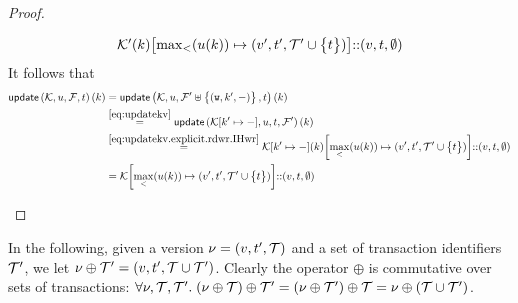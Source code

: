 \begin{proof}
\begin{enumerate}
\begin{itemize}
\begin{equation}
\begin{array}{l}
            \mkvs'(\key)\rmto{\max_{<}(\vi(\key))}{(\val', \txid', \txidset' \cup \Set{\txid})} \lcat (\val, \txid, \emptyset)
            \end{array}
			\end{equation}
			It follows that 
            \begin{align*}
			    \updateKV[\mkvs, \vi, \fp, \txid](\key)
                & =
                \updateKV[\mkvs, \vi, \fp' \uplus \Set{(\otW, \key', \stub)}, \txid](\key) \\
                & \stackrel{\cref{eq:updatekv}}{=} 
			    \updateKV[\mkvs\rmto{\key'}{\stub}, \vi, \txid, \fp'](\key) \\
                & \stackrel{\cref{eq:updatekv.explicit.rdwr.IHwr}}{=}
                \mkvs\rmto{\key'}{\stub}(\key)\rmto{\max_{<}(\vi(\key))}{(\val', \txid', \txidset' \cup \Set{\txid})} \lcat (\val, \txid, \emptyset) \\
                & =
                \mkvs\rmto{\max_{<}(\vi(\key))}{(\val', \txid', \txidset' \cup \Set{\txid})} \lcat (\val, \txid, \emptyset)
            \end{align*}
			\end{itemize}
\end{enumerate}
\end{proof}

In the following, given a version $\nu = (v, t', \mathcal{T})$ and a set of 
transaction identifiers $\mathcal{T}'$, we let $\nu \oplus \mathcal{T}' = (v, t', \mathcal{T} \cup \mathcal{T}')$. 
Clearly the operator $\oplus$ is commutative over sets of transactions: 
$\forall \nu, \mathcal{T}, \mathcal{T}'.\; (\nu \oplus \mathcal{T}) \oplus \mathcal{T}' = (\nu \oplus \mathcal{T}') \oplus \mathcal{T} = 
\nu \oplus (\mathcal{T} \cup \mathcal{T}')$.

